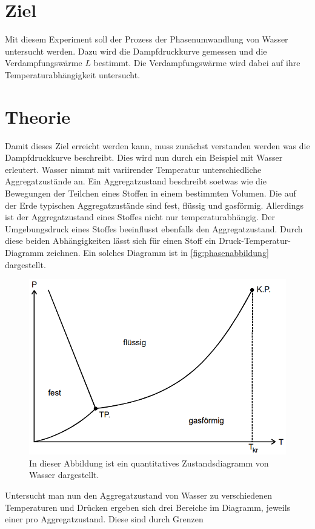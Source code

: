 \section{Ziel}
\label{sec:Ziel}
Mit diesem Experiment soll der Prozess der Phasenumwandlung von Wasser untersucht werden. Dazu wird die Dampfdruckkurve gemessen und die Verdampfungswärme $L$ bestimmt. Die Verdampfungswärme wird
dabei auf ihre Temperaturabhängigkeit untersucht.
\section{Theorie}
\label{sec:Theorie}
Damit dieses Ziel erreicht werden kann, muss zunächst verstanden werden was die Dampfdruckkurve beschreibt. Dies wird nun durch ein Beispiel mit Wasser erleutert.
Wasser nimmt mit variirender Temperatur unterschiedliche Aggregatzustände an. Ein Aggregatzustand beschreibt soetwas wie die Bewegungen der Teilchen eines Stoffen in einem bestimmten Volumen.
Die auf der Erde typischen Aggregatzustände sind fest, flüssig und gasförmig. Allerdings ist der Aggregatzustand eines Stoffes nicht nur temperaturabhängig. Der Umgebungsdruck eines Stoffes 
beeinflusst ebenfalls den Aggregatzustand. Durch diese beiden Abhängigkeiten lässt sich für einen Stoff ein Druck-Temperatur-Diagramm zeichnen. Ein solches Diagramm ist in \autoref{fig:phasenabbildung}
dargestellt.
\begin{figure}
    \centering
    \includegraphics[width=\textwidth]{content/Phasenabbildung.PNG}
	\caption{In dieser Abbildung ist ein quantitatives Zustandsdiagramm von Wasser dargestellt. \cite{v203}}
	\label{fig:phasenabbildung}
\end{figure}
Untersucht man nun den Aggregatzustand von Wasser zu verschiedenen Temperaturen und Drücken ergeben sich drei Bereiche im Diagramm, jeweils einer pro Aggregatzustand.  Diese sind durch Grenzen
